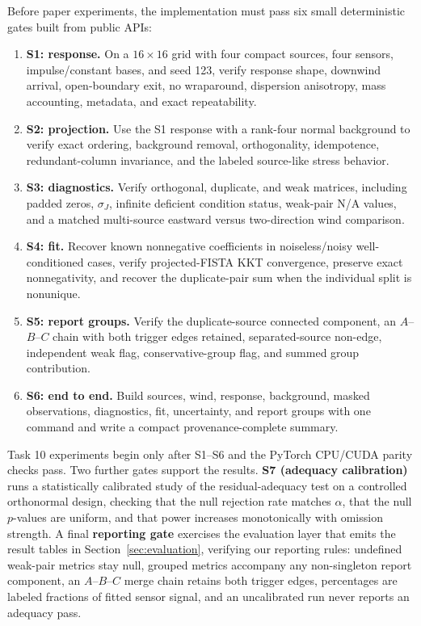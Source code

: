 Before paper experiments, the implementation must pass six small deterministic
gates built from public APIs:
\begin{enumerate}[leftmargin=*]
    \item \textbf{S1: response.}  On a \(16\times16\) grid with four compact
    sources, four sensors, impulse/constant bases, and seed 123, verify response
    shape, downwind arrival, open-boundary exit, no wraparound, dispersion
    anisotropy, mass accounting, metadata, and exact repeatability.
    \item \textbf{S2: projection.}  Use the S1 response with a rank-four normal
    background to verify exact ordering, background removal, orthogonality,
    idempotence, redundant-column invariance, and the labeled source-like stress
    behavior.
    \item \textbf{S3: diagnostics.}  Verify orthogonal, duplicate, and weak
    matrices, including padded zeros, \(\sigma_J\), infinite deficient
    condition status, weak-pair N/A values, and a matched multi-source eastward
    versus two-direction wind comparison.
    \item \textbf{S4: fit.}  Recover known nonnegative coefficients in
    noiseless/noisy well-conditioned cases, verify projected-FISTA KKT
    convergence, preserve exact nonnegativity, and recover the duplicate-pair
    sum when the individual split is nonunique.
    \item \textbf{S5: report groups.}  Verify the duplicate-source connected
    component, an \(A\)--\(B\)--\(C\) chain with both trigger edges retained,
    separated-source non-edge, independent weak flag, conservative-group flag,
    and summed group contribution.
    \item \textbf{S6: end to end.}  Build sources, wind, response, background,
    masked observations, diagnostics, fit, uncertainty, and report groups with
    one command and write a compact provenance-complete summary.
\end{enumerate}
Task 10 experiments begin only after S1--S6 and the PyTorch CPU/CUDA parity
checks pass.  Two further gates support the results.  \textbf{S7 (adequacy
calibration)} runs a statistically calibrated study of the residual-adequacy test
on a controlled orthonormal design, checking that the null rejection rate matches
\(\alpha\), that the null \(p\)-values are uniform, and that power increases
monotonically with omission strength.  A final \textbf{reporting gate} exercises
the evaluation layer that emits the result tables in Section~\ref{sec:evaluation},
verifying our reporting rules: undefined weak-pair metrics stay null,
grouped metrics accompany any non-singleton report component, an \(A\)--\(B\)--\(C\)
merge chain retains both trigger edges, percentages are labeled fractions of fitted
sensor signal, and an uncalibrated run never reports an adequacy pass.

